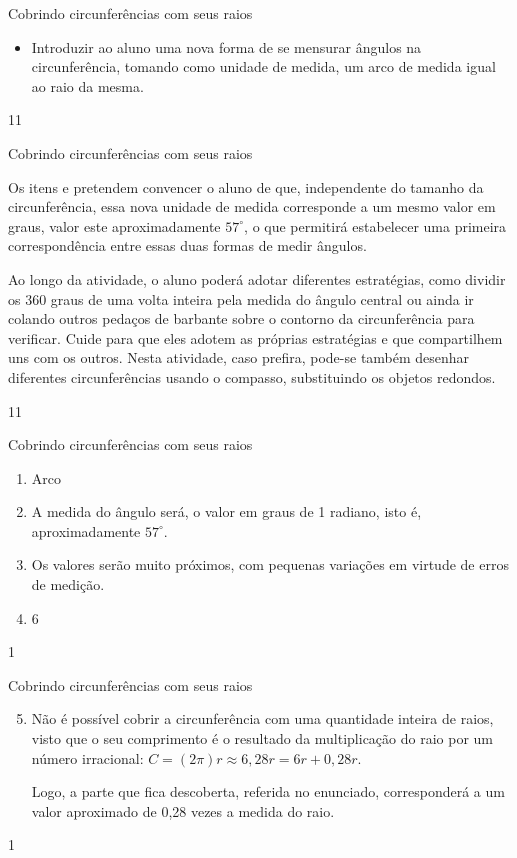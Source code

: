 \def\currentcolor{session1}
\begin{objectives}{Cobrindo circunferências com seus raios}
{
\begin{itemize}
\item Introduzir ao aluno uma nova forma de se mensurar ângulos na circunferência, tomando como unidade de medida, um arco de medida igual ao raio da mesma.
\end{itemize}
}{1}{1}
\end{objectives}
\begin{sugestions}{Cobrindo circunferências com seus raios}
{
Os itens  e  pretendem convencer o aluno de que, independente do tamanho da circunferência, essa nova unidade de medida corresponde a um mesmo valor em graus, valor este aproximadamente $57^{\circ}$, o que permitirá estabelecer uma primeira correspondência entre essas duas formas de medir ângulos. 

Ao longo da atividade, o aluno poderá adotar diferentes estratégias, como dividir os $360$ graus de uma volta inteira pela medida do ângulo central ou ainda ir colando outros pedaços de barbante sobre o contorno da circunferência para verificar. Cuide para que eles adotem as próprias estratégias e que compartilhem uns com os outros. Nesta atividade, caso prefira, pode-se também desenhar diferentes circunferências usando o compasso, substituindo os objetos redondos.
}{1}{1}
\end{sugestions}
\begin{answer}{Cobrindo circunferências com seus raios}
{
\begin{enumerate}
\item Arco
\item A medida do ângulo será, o valor em graus de 1 radiano,
isto é, aproximadamente $57^{\circ}$.
\item Os valores serão muito próximos, com pequenas variações em virtude de erros de medição.
\item $6$
\end{enumerate}
}{1}
\end{answer}
\clearmargin
\begin{answer}{Cobrindo circunferências com seus raios}
{
	\begin{enumerate}\setcounter{enumi}{4}
	\item Não é possível cobrir a circunferência com uma quantidade inteira de raios, visto que o seu comprimento é o resultado da multiplicação do raio por um número irracional: $C =(2\pi)r\approx6{,}28r = 6r + 0{,}28r$.

	Logo, a parte que fica descoberta, referida no enunciado, corresponderá a um valor aproximado de 0,28 vezes a medida do raio. 
	\end{enumerate}
}{1}
\end{answer}
